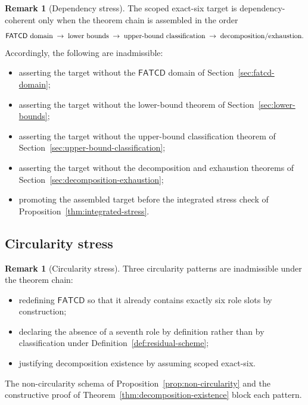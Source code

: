 \documentclass[11pt]{article}
\theoremstyle{definition}
\newtheorem{remark}[theorem]{Remark}
\newcommand{\FATCD}{\ensuremath{\mathsf{FATCD}}}
\begin{document}
\begin{remark}[Dependency stress]\label{prop:dependency-stress}
The scoped exact-six target is dependency-coherent only when the theorem
chain is assembled in the order
\[
\text{\FATCD{} domain} \;\rightarrow\; \text{lower bounds} \;\rightarrow\;
\text{upper-bound classification} \;\rightarrow\;
\text{decomposition/exhaustion}.
\]
Accordingly, the following are inadmissible:
\begin{itemize}[topsep=2pt,itemsep=1pt]
  \item asserting the target without the \FATCD{} domain of
    Section~\ref{sec:fatcd-domain};
  \item asserting the target without the lower-bound theorem of
    Section~\ref{sec:lower-bounds};
  \item asserting the target without the upper-bound classification
    theorem of Section~\ref{sec:upper-bound-classification};
  \item asserting the target without the decomposition and exhaustion
    theorems of Section~\ref{sec:decomposition-exhaustion};
  \item promoting the assembled target before the integrated stress
    check of Proposition~\ref{thm:integrated-stress}.
\end{itemize}
\end{remark}

\subsection{Circularity stress}\label{subsec:circularity-stress}

\begin{remark}[Circularity stress]\label{prop:circularity-stress}
Three circularity patterns are inadmissible under the theorem chain:
\begin{itemize}[topsep=2pt,itemsep=1pt]
  \item redefining \FATCD{} so that it already contains exactly six role
    slots by construction;
  \item declaring the absence of a seventh role by definition rather
    than by classification under Definition~\ref{def:residual-scheme};
  \item justifying decomposition existence by assuming scoped
    exact-six.
\end{itemize}
The non-circularity schema of Proposition~\ref{prop:non-circularity} and
the constructive proof of Theorem~\ref{thm:decomposition-existence}
block each pattern.
\end{remark}
\end{document}
